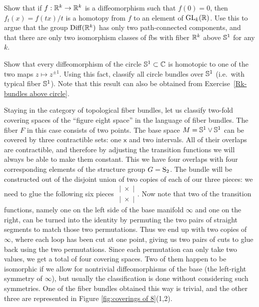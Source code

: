 \begin{xca}\label{Rk-bundles above circle}
    Show that if $f:\mathbb{R}^k\to \mathbb{R}^k$ is a diffeomorphism such that $f(0)=0$, then $f_t(x)=f(tx)/t$ is a homotopy from $f$ to an element of $\operatorname{GL}_k(\mathbb{R})$. Use this to argue that the group $\operatorname{Diff}(\mathbb{R}^k)$ has only two path-connected components, and that there are only two isomorphism classes of \glspl{fb} with fiber $\mathbb{R}^k$  above $\mathbb{S}^1$ for any $k$.
\end{xca}
\begin{xca}
    Show that every diffeomorphism of the circle $\mathbb{S}^1\subset \mathbb{C}$ is homotopic to one of the two maps $z\mapsto z^{\pm 1}$. Using this fact, classify all circle bundles over $\mathbb{S}^1$ (i.e.~with typical fiber $\mathbb{S}^1$). Note that this result can also be obtained from Exercise~\ref{Rk-bundles above circle}.
\end{xca}

\begin{example}
    Staying in the category of topological fiber bundles, let us classify two-fold covering spaces of the ``figure eight space'' in the language of fiber bundles. The fiber $F$ in this case consists of two points. The base space $M=\mathbb{S}^1\vee \mathbb{S}^1$ can be covered by three contractible sets: one $\mathsf{x}$ and two intervals. All of their overlaps are contractible, and therefore by adjusting the transition functions we will always be able to make them constant. This we have four overlaps with four corresponding elements of the structure group $G=\mathrm{S}_2$. The bundle will be constructed out of the disjoint union of two copies of each of our three pieces: we need to glue the following six pieces $\begin{matrix}
        |\; \times \;|\\
        |\; \times \;|
    \end{matrix}$. Now note that two of the transition functions, namely one on the left side of the base manifold $\infty$ and one on the right, can be turned into the identity by permuting the two pairs of straight segments to match those two permutations. Thus we end up with two copies of $\infty$, where each loop has been cut at one point, giving us two pairs of cuts to glue back using the two permutations. Since each permutation can only take two values, we get a total of four covering spaces. Two of them happen to be isomorphic if we allow for nontrivial diffeomorphisms of the base (the left-right symmetry of $\infty$), but usually the classification is done without considering such symmetries. One of the fiber bundles obtained this way is trivial, and the other three are represented in Figure \ref{fig:coverings of 8}(1,2).
\end{example}

